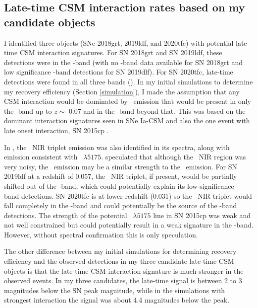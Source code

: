 \documentclass[a4paper,oneside,12pt, class=Latex/Classes/PhDthesisPSnPDF, crop=false]{standalone}
\begin{document}
\subsection{Late-time CSM interaction rates based on my candidate objects}
\label{rates_csm}

 I identified three objects (SNe 2018grt, 2019ldf, and 2020tfc) with potential late-time CSM interaction signatures. For SN 2018grt and SN 2019ldf, these detections were in the \ztfr-band (with no \ztfi-band data available for SN 2018grt and low significance \ztfi-band detections for SN 2019dlf). For SN 2020tfc, late-time detections were found in all three bands (\ztfg\ztfr\ztfi). In my initial simulations to determine my recovery efficiency (Section \ref{simulation}), I made the assumption that any CSM interaction would be dominated by \Halpha~emission that would be present in only the \ztfr-band up to $z \sim$ 0.07 and in the \ztfi-band beyond that. This was based on the dominant interaction signatures seen in SNe Ia-CSM and also the one event with late onset interaction, SN 2015cp \citep{2015cp}. 

In \citet{2015cp}, the \CaII\ NIR triplet emission was also identified in its spectra, along with emission consistent with \MgI~$\lambda5175$. \cite{2015cp_radio} speculated that although the \CaII\ NIR region was very noisy, the \CaII\ emission may be a similar strength to the \Halpha~emission. For SN 2019ldf at a redshift of 0.057, the \CaII\ NIR triplet, if present, would be partially shifted out of the \ztfi-band, which could potentially explain its low-significance \ztfi-band detections. SN 2020tfc is at lower redshift (0.031) so the \CaII\ NIR triplet would fall completely in the \ztfi-band and could potentially be the source of the \ztfi-band detections. The strength of the potential \MgI~$\lambda5175$ line in SN 2015cp was weak and not well constrained \citep{2015cp} but could potentially result in a weak signature in the \ztfg-band. However, without spectral confirmation this is only speculation.

The other difference between my initial simulations for determining recovery efficiency and the observed detections in my three candidate late-time CSM objects is that the late-time CSM interaction signature is much stronger in the observed events. In my three candidates, the late-time signal is between 2 to 3 magnitudes below the SN peak magnitude, while in the simulations with strongest interaction the signal was about 4.4 magnitudes below the peak.
\end{document}
